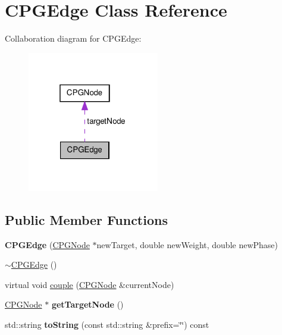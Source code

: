 \hypertarget{class_c_p_g_edge}{\section{C\-P\-G\-Edge Class Reference}
\label{class_c_p_g_edge}
}


Collaboration diagram for C\-P\-G\-Edge\-:\nopagebreak
\begin{figure}[H]
\begin{center}
\leavevmode
\includegraphics[width=163pt]{class_c_p_g_edge__coll__graph}
\end{center}
\end{figure}
\subsection*{Public Member Functions}
\begin{DoxyCompactItemize}
\item 
\hypertarget{class_c_p_g_edge_afb98365a70af9a064abfc9d4167bb3f7}{{\bfseries C\-P\-G\-Edge} (\hyperlink{class_c_p_g_node}{C\-P\-G\-Node} $\ast$new\-Target, double new\-Weight, double new\-Phase)}\label{class_c_p_g_edge_afb98365a70af9a064abfc9d4167bb3f7}

\item 
\hyperlink{class_c_p_g_edge_addf39bbf494c96c60fb5546611414d7a}{$\sim$\-C\-P\-G\-Edge} ()
\item 
virtual void \hyperlink{class_c_p_g_edge_aecea428c30891ef8632192cfe2fa3649}{couple} (\hyperlink{class_c_p_g_node}{C\-P\-G\-Node} \&current\-Node)
\item 
\hypertarget{class_c_p_g_edge_a1f4afbee9e7fa17d2062e5d507574240}{\hyperlink{class_c_p_g_node}{C\-P\-G\-Node} $\ast$ {\bfseries get\-Target\-Node} ()}\label{class_c_p_g_edge_a1f4afbee9e7fa17d2062e5d507574240}

\item 
\hypertarget{class_c_p_g_edge_af80a4916df680b83d391e82390f0f260}{std\-::string {\bfseries to\-String} (const std\-::string \&prefix=\char`\"{}\char`\"{}) const }\label{class_c_p_g_edge_af80a4916df680b83d391e82390f0f260}

\end{DoxyCompactItemize}
